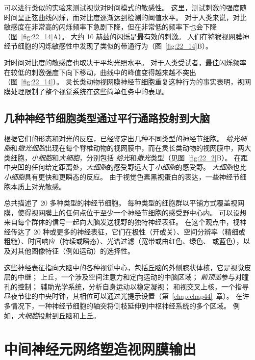\begin{proposition}[人类感知的时空敏感性]
	\quad \quad 可以进行类似的实验来测试视觉对时间模式的敏感性。
	这里，测试刺激的强度随时间呈正弦曲线闪烁，而对比度逐渐达到检测的阈值水平。
	对于人类来说，对比敏感度在非常高的闪烁频率下急剧下降，但在非常低的频率下也会下降（图~\ref{fig:22_14}A）。
	大约 10 赫兹的闪烁是最有效的刺激。
	人们在猕猴视网膜神经节细胞的闪烁敏感性中发现了类似的带通行为（图~\ref{fig:22_14}B）。
	
	\quad \quad 对时间对比度的敏感度也取决于平均光照水平。
	对于人类受试者，最佳闪烁频率在较低的刺激强度下向下移动，曲线中的峰值变得越来越不突出（图~\ref{fig:22_14}）。
	灵长类动物视网膜神经节细胞重复这种行为的事实表明，视网膜处理限制了整个视觉系统在这些简单任务中的表现。
	
\end{proposition}



\subsection{几种神经节细胞类型通过平行通路投射到大脑}

根据它们的形态和对光的反应，已经鉴定出几种不同类型的神经节细胞。
\textit{给光细胞}和\textit{撤光细胞}出现在每个脊椎动物的视网膜中，而在灵长类动物的视网膜中，两大类细胞，\textit{小细胞}和\textit{大细胞}，分别包括 \textit{给光}和\textit{撤光}类型（见图~\ref{fig:22_2}B）。
在距中央凹的任何给定距离处，\textit{大细胞}的感受野远大于\textit{小细胞}的感受野。
\textit{大细胞}也比\textit{小细胞}具有更快和更瞬态的反应。
由于视觉色素黑视蛋白的表达，一些神经节细胞本质上对光敏感。


总共描述了 20 多种类型的神经节细胞。
每种类型的细胞群以平铺方式覆盖视网膜，使得视网膜上的任何点位于至少一个神经节细胞的感受野中心内。
可以设想来自每个群体的信号一起向大脑发送视野的独特神经表征。
在这个观点中，视神经传达了 20 种或更多的神经表征，它们在极性（开或关）、空间分辨率（精细或粗糙）、时间响应（持续或瞬态）、光谱过滤（宽带或由红色、绿色、 或蓝色），以及对其他图像特征（例如运动）的选择性。


这些神经表征指向大脑中的各种视觉中心，包括丘脑的外侧膝状体核，它是视觉皮层的中继；
上丘，一个涉及空间注意力和定向运动的中脑区域；
\textit{前顶盖}参与对瞳孔的控制； 
辅助光学系统，分析自身运动以稳定凝视；
和视交叉上核，一个指导昼夜节律的中央时钟，其相位可以通过光提示设置（第~\ref{chap:chap44}~章）。 
在许多情况下，一种神经节细胞的轴突将侧枝延伸到中枢神经系统的多个区域。
例如，\textit{大细胞}投射到丘脑和上丘。



\section{中间神经元网络塑造视网膜输出}

